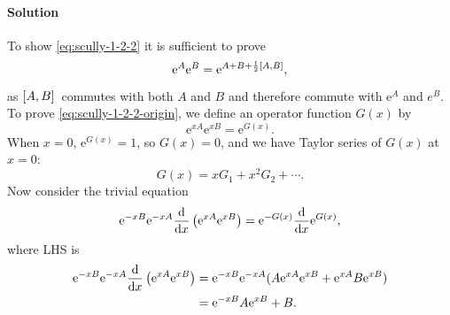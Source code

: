 \documentclass[hyperref, a4paper]{article}
\newcommand*{\ee}{\mathrm{e}}
\begin{document}
\paragraph{Solution} To show \eqref{eq:scully-1-2-2} it is sufficient to prove 
\begin{equation}
    \ee^{A} \ee^{B} = \ee^{A + B + \frac{1}{2} \comm*{A}{B}},
    \label{eq:scully-1-2-2-origin}
\end{equation}
as $\comm*{A}{B}$ commutes with both $A$ and $B$ and therefore commute with $\ee^A$ and $e^B$.
To prove \eqref{eq:scully-1-2-2-origin}, we define an operator function $G(x)$ by 
\begin{equation}
    \ee^{x A} \ee^{x B} = \ee^{G(x)}.
    \label{eq:scully-1-2-temp-5}
\end{equation}
When $x=0$, $\ee^{G(x)} = 1$, so $G(x) = 0$, and we have Taylor series of $G(x)$ at $x=0$:
\[
    G(x) = x G_1 + x^2 G_2 + \cdots.
\]
Now consider the trivial equation
\begin{equation}
    \ee^{- xB} \ee^{- xA} \dv{x} \left( \ee^{x A} \ee^{x B} \right) = \ee^{-G(x)} \dv{x} \ee^{G(x)},
    \label{eq:scully-1-2-temp-1}
\end{equation}
where LHS is 
\begin{equation}
    \begin{aligned}
        \ee^{- xB} \ee^{- xA} \dv{x} \left( \ee^{x A} \ee^{x B} \right) &=  \ee^{- xB} \ee^{- xA} (A \ee^{x A} \ee^{x B} + \ee^{x A} B \ee^{x B}) \\
        &= \ee^{-xB} A \ee^{xB} + B.
    \end{aligned}
    \label{eq:scully-1-2-temp-2}
\end{equation}
\end{document}
